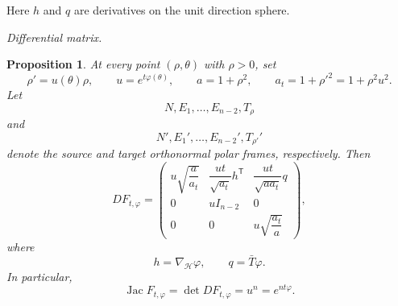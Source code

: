 \documentclass[11pt,reqno]{amsart}
\numberwithin{equation}{section}
\newtheorem{proposition}[theorem]{Proposition}
\theoremstyle{definition}
\theoremstyle{remark}
\newcommand{\Jac}{\operatorname{Jac}}
\newcommand{\ithead}[1]{%
  \par\medskip\noindent\textit{#1}\enspace
}
\begin{document}
Here \(h\) and \(q\) are derivatives on the unit direction sphere.

\ithead{Differential matrix.}

\begin{proposition}
\label{prop:basic-matrix}
At every point $(\rho,\theta)$ with $\rho>0$, set
\[
\rho'=u(\theta)\rho,
\qquad
u=e^{t\varphi(\theta)},
\qquad
a=1+\rho^{2},
\qquad
a_t=1+\rho'^2=1+\rho^{2}u^{2}.
\]
Let
\[
N,E_{1},\ldots,E_{n-2},T_{\rho}
\]
and
\[
N',E_{1}',\ldots,E_{n-2}',T_{\rho'}'
\]
denote the source and target orthonormal polar frames, respectively.
Then
\[
DF_{t,\varphi}
=
\begin{pmatrix}
u\sqrt{\dfrac{a}{a_t}}
&
\dfrac{ut}{\sqrt{a_t}}h^{\mathsf T}
&
\dfrac{ut}{\sqrt{aa_t}}q
\\[8pt]
0
&
uI_{n-2}
&
0
\\
0
&
0
&
u\sqrt{\dfrac{a_t}{a}}
\end{pmatrix},
\]
where
\[
h=\nabla_{\mathcal H}\varphi,
\qquad
q=\bar T\varphi.
\]
In particular,
\begin{equation}
\Jac F_{t,\varphi}
=
\det DF_{t,\varphi}
=
u^n
=
e^{nt\varphi}.
\label{eq:basic-ambient-jacobian}
\end{equation}
\end{proposition}
\end{document}
